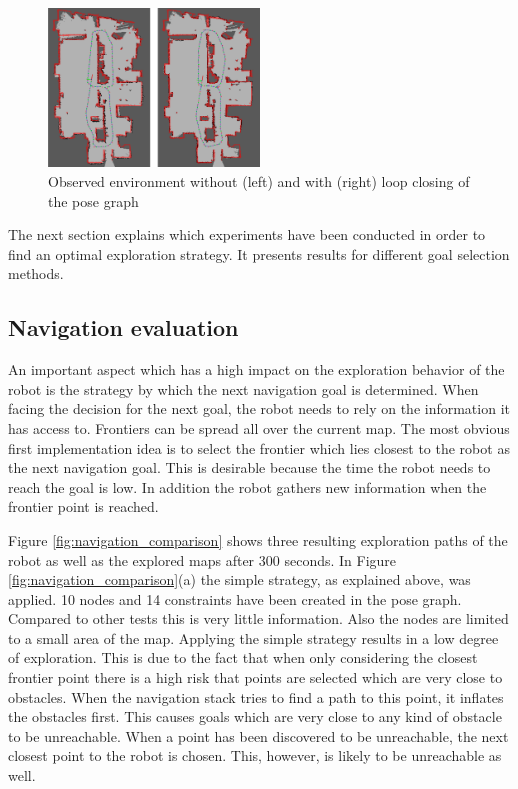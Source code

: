 \documentclass{ba-kecs}
\begin{document}
\begin{figure}[htbp]
	\centering
		\includegraphics[width=0.50\textwidth]{figures/Loop_closing_compared.jpg}
	\caption{Observed environment without (left) and with (right) loop closing of the pose graph}
	\label{fig:loop_closing_comparison}
\end{figure}
The next section explains which experiments have been conducted in order to find an optimal exploration strategy. It presents results for different goal selection methods.

\subsection{Navigation evaluation}
\label{sec:navEval}
An important aspect which has a high impact on the exploration behavior of the robot is the strategy by which the next navigation goal is determined. When facing the decision for the next goal, the robot needs to rely on the information it has access to. Frontiers can be spread all over the current map. The most obvious first implementation idea is to select the frontier which lies closest to the robot as the next navigation goal. This is desirable because the time the robot needs to reach the goal is low. In addition the robot gathers new information when the frontier point is reached.

Figure \ref{fig:navigation_comparison} shows three resulting exploration paths of the robot as well as the explored maps after 300 seconds. In Figure \ref{fig:navigation_comparison}(a) the simple strategy, as explained above, was applied. 10 nodes and 14 constraints have been created in the pose graph. Compared to other tests this is very little information. Also the nodes are limited to a small area of the map. Applying the simple strategy results in a low degree of exploration. This is due to the fact that when only considering the closest frontier point there is a high risk that points are selected which are very close to obstacles. When the navigation stack tries to find a path to this point, it inflates the obstacles first. This causes goals which are very close to any kind of obstacle to be unreachable. When a point has been discovered to be unreachable, the next closest point to the robot is chosen. This, however, is likely to be unreachable as well.
\end{document}
